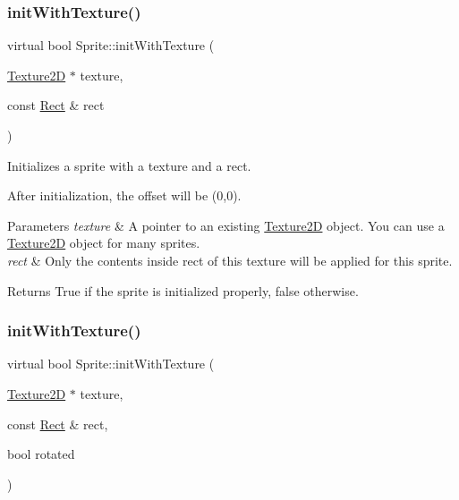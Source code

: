 \subsubsection{\texorpdfstring{init\+With\+Texture()}{initWithTexture()}\hspace{0.1cm}{\footnotesize\ttfamily [5/6]}}
{\footnotesize\ttfamily virtual bool Sprite\+::init\+With\+Texture (\begin{DoxyParamCaption}\item[{\hyperlink{classTexture2D}{Texture2D} $\ast$}]{texture,  }\item[{const \hyperlink{classRect}{Rect} \&}]{rect }\end{DoxyParamCaption})\hspace{0.3cm}{\ttfamily [virtual]}}

Initializes a sprite with a texture and a rect.

After initialization, the offset will be (0,0).


\begin{DoxyParams}{Parameters}
{\em texture} & A pointer to an existing \hyperlink{classTexture2D}{Texture2D} object. You can use a \hyperlink{classTexture2D}{Texture2D} object for many sprites. \\
\hline
{\em rect} & Only the contents inside rect of this texture will be applied for this sprite. \\
\hline
\end{DoxyParams}
\begin{DoxyReturn}{Returns}
True if the sprite is initialized properly, false otherwise. 
\end{DoxyReturn}
\mbox{\label{classSprite_a30295e474da1a9c11ebe97f04a6a49fc}} 
\subsubsection{\texorpdfstring{init\+With\+Texture()}{initWithTexture()}\hspace{0.1cm}{\footnotesize\ttfamily [6/6]}}
{\footnotesize\ttfamily virtual bool Sprite\+::init\+With\+Texture (\begin{DoxyParamCaption}\item[{\hyperlink{classTexture2D}{Texture2D} $\ast$}]{texture,  }\item[{const \hyperlink{classRect}{Rect} \&}]{rect,  }\item[{bool}]{rotated }\end{DoxyParamCaption})\hspace{0.3cm}{\ttfamily [virtual]}}

